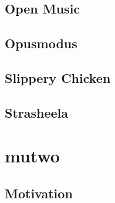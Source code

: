\documentclass[12pt,a4paper,ngerman]{article}
\begin{document}
\subsection{Open Music}

\subsection{Opusmodus}

\subsection{Slippery Chicken}

\subsection{Strasheela}




\section{mutwo}

\subsection{Motivation}



\end{document}

